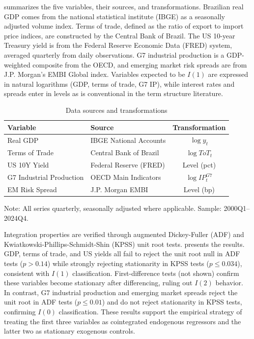 \documentclass[12pt,a4paper]{article}
\numberwithin{equation}{section}
\theoremstyle{definition}
\theoremstyle{remark}
\begin{document}
 summarizes the five variables, their sources, and transformations. Brazilian real GDP comes from the national statistical institute (IBGE) as a seasonally adjusted volume index. Terms of trade, defined as the ratio of export to import price indices, are constructed by the Central Bank of Brazil. The US 10-year Treasury yield is from the Federal Reserve Economic Data (FRED) system, averaged quarterly from daily observations. G7 industrial production is a GDP-weighted composite from the OECD, and emerging market risk spreads are from J.P. Morgan's EMBI Global index. Variables expected to be $I(1)$ are expressed in natural logarithms (GDP, terms of trade, G7 IP), while interest rates and spreads enter in levels as is conventional in the term structure literature.

\begin{table}[ht]
\centering
\begin{threeparttable}
\caption{Data sources and transformations}
\label{tab:data_sources}
\begin{tabular}{@{}llc@{}}
\toprule
\textbf{Variable} & \textbf{Source} & \textbf{Transformation} \\
\midrule
Real GDP & IBGE National Accounts & $\log y_t$ \\
Terms of Trade & Central Bank of Brazil & $\log ToT_t$ \\
US 10Y Yield & Federal Reserve (FRED) & Level (pct) \\
G7 Industrial Production & OECD Main Indicators & $\log IP^{G7}_t$ \\
EM Risk Spread & J.P. Morgan EMBI & Level (bp) \\
\bottomrule
\end{tabular}
\begin{tablenotes}\footnotesize
\item Note: All series quarterly, seasonally adjusted where applicable. Sample: 2000Q1--2024Q4.
\end{tablenotes}
\end{threeparttable}
\end{table}

Integration properties are verified through augmented Dickey-Fuller (ADF) and Kwiatkowski-Phillips-Schmidt-Shin (KPSS) unit root tests.  presents the results. GDP, terms of trade, and US yields all fail to reject the unit root null in ADF tests ($p > 0.14$) while strongly rejecting stationarity in KPSS tests ($p \leq 0.034$), consistent with $I(1)$ classification. First-difference tests (not shown) confirm these variables become stationary after differencing, ruling out $I(2)$ behavior. In contrast, G7 industrial production and emerging market spreads reject the unit root in ADF tests ($p \leq 0.01$) and do not reject stationarity in KPSS tests, confirming $I(0)$ classification. These results support the empirical strategy of treating the first three variables as cointegrated endogenous regressors and the latter two as stationary exogenous controls.
\end{document}
